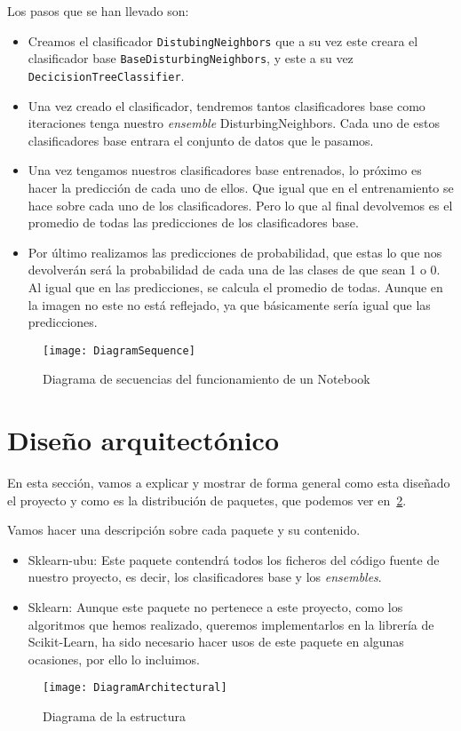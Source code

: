 Los pasos que se han llevado son:
\begin{itemize}
	\item Creamos el clasificador \texttt{DistubingNeighbors} que a su vez este creara el clasificador base \texttt{BaseDisturbingNeighbors}, y este a su vez \texttt{DecicisionTreeClassifier}.
	\item Una vez creado el clasificador, tendremos tantos clasificadores base como iteraciones tenga nuestro \textit{ensemble}  DisturbingNeighbors. Cada uno de estos clasificadores base entrara el conjunto de datos que le pasamos.
	\item Una vez tengamos nuestros clasificadores base entrenados, lo próximo es hacer la predicción de cada uno de ellos. Que igual que en el entrenamiento se hace sobre cada uno de los clasificadores. Pero lo que al final devolvemos es el promedio de todas las predicciones de los clasificadores base.
	\item Por último realizamos las predicciones de probabilidad, que estas lo que nos devolverán será la probabilidad de cada una de las clases de que sean 1 o 0. Al igual que en las predicciones, se calcula el promedio de todas. Aunque en la imagen no este no está reflejado, ya que básicamente sería igual que las predicciones. 
\end{itemize}
\begin{figure}
\centering
\texttt{[image: DiagramSequence]}
\caption{Diagrama de secuencias del funcionamiento de un Notebook}
\label{fig:DiagramSequence}
\end{figure}

\section{Diseño arquitectónico}
En esta sección, vamos a explicar y mostrar de forma general como esta diseñado el proyecto y como es la distribución de paquetes, que podemos ver en~\ref{fig:DiagramArchitectural}.

Vamos hacer una descripción sobre cada paquete y su contenido.
\begin{itemize}
	\item Sklearn-ubu: Este paquete contendrá todos los ficheros del código fuente de nuestro proyecto, es decir, los clasificadores base y los \textit{ensembles}.
	
	\item Sklearn: Aunque este paquete no pertenece a este proyecto, como los algoritmos que hemos realizado, queremos implementarlos en la librería de Scikit-Learn, ha sido necesario hacer usos de este paquete en algunas ocasiones, por ello lo incluimos.
	
\end{itemize}
\begin{figure}
\centering
\texttt{[image: DiagramArchitectural]}
\caption{Diagrama de la estructura}
\label{fig:DiagramArchitectural}
\end{figure}
